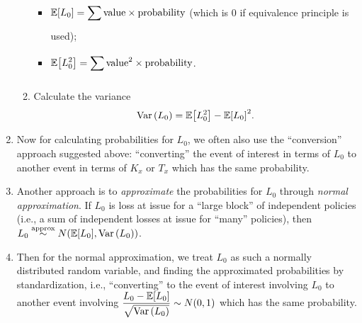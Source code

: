 \begin{enumerate}
\begin{enumerate}
\begin{itemize}
\item \(\displaystyle \mathbb{E}\qty[L_0]=\sum_{}^{}\text{value}\times\text{probability}\) (which is 0 if equivalence principle is used);
\item \(\displaystyle \mathbb{E}\qty[L_0^2]=\sum_{}^{}\text{value}^2\times\text{probability}\).
\end{itemize}
\item Calculate the variance
\[
\operatorname{Var}\qty(L_0)=\mathbb{E}\qty[L_0^2]-\mathbb{E}\qty[L_0]^2.
\]
\end{enumerate}
\item \label{it:cal-loss-prob}
Now for calculating probabilities for \(L_0\), we often also use the
``conversion'' approach suggested above: ``converting'' the event of interest
in terms of \(L_0\) to another event in terms of \(K_x\) or \(T_x\) which has
the same probability.

\item \label{it:approx-loss-prob}
Another approach is to \emph{approximate} the probabilities for \(L_0\)
through \emph{normal approximation}. If \(L_0\) is loss at issue for a ``large
block'' of independent policies (i.e., a sum of independent losses at issue for
``many'' policies), then \(L_0\overset{\text{approx}}{\sim} N(\mathbb{E}\qty[L_0],\operatorname{Var}\qty(L_0))\).

\item Then for the normal approximation, we treat \(L_0\) as such a normally
distributed random variable, and finding the approximated probabilities by
standardization, i.e., ``converting'' to the event of interest involving
\(L_0\) to another event involving \(\displaystyle \frac{L_0-\mathbb{E}\qty[L_0]}{\sqrt{\operatorname{Var}\qty(L_0)}}\sim
N(0,1)\) which has the same probability.
\end{enumerate}

